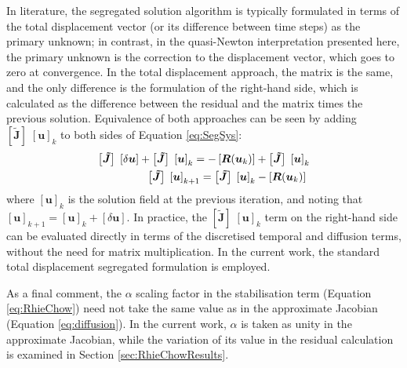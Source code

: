 \documentclass[sn-mathphys,Numbered]{sn-jnl}%
\newcommand{\bb}{\boldsymbol}
\begin{document}
In literature, the segregated solution algorithm is typically formulated in terms of the total displacement vector (or its difference between time steps) as the primary unknown; in contrast, in the quasi-Newton interpretation presented here, the primary unknown is the correction to the displacement vector, which goes to zero at convergence.
In the total displacement approach, the matrix is the same, and the only difference is the formulation of the right-hand side, which is calculated as the difference between the residual and the matrix times the previous solution.
Equivalence of both approaches can be seen by adding $\left[ \bb{\tilde{J}} \right]  \; \left[ \bb{u} \right]_k$ to both sides of Equation \ref{eq:SegSys}:
\begin{eqnarray} \label{eq:SegSys}
    \left[ \bb{\tilde{J}} \right]  \; \left[ \delta \bb{u} \right] + \left[ \bb{\tilde{J}} \right]  \; \left[ \bb{u} \right]_k  = - \left[\bb{R}(\bb{u}_k)\right] + \left[ \bb{\tilde{J}} \right]  \; \left[ \bb{u} \right]_k \notag \\
    \left[ \bb{\tilde{J}} \right]  \; \left[ \bb{u} \right]_{k+1} = \left[ \bb{\tilde{J}} \right]  \; \left[ \bb{u} \right]_k - \left[\bb{R}(\bb{u}_k)\right] \
\end{eqnarray}
where $\left[ \bb{u} \right]_k$ is the solution field at the previous iteration, and noting that $\left[ \bb{u} \right]_{k+1} = \left[ \bb{u} \right]_k + \left[ \delta \bb{u} \right]$.
In practice, the $\left[ \bb{\tilde{J}} \right]  \; \left[ \bb{u} \right]_k$ term on the right-hand side can be evaluated directly in terms of the discretised temporal and diffusion terms, without the need for matrix multiplication.
In the current work, the standard total displacement segregated formulation is employed.

As a final comment, the $\alpha$ scaling factor in the stabilisation term (Equation \ref{eq:RhieChow}) need not take the same value as in the approximate Jacobian (Equation \ref{eq:diffusion}).
In the current work, $\alpha$ is taken as unity in the approximate Jacobian, while the variation of its value in the residual calculation is examined in Section \ref{sec:RhieChowResults}.

\end{document}

